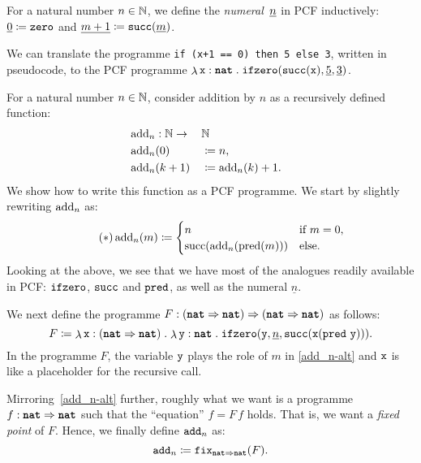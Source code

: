 \begin{definition}
  For a natural number \(n \in \Nat\), we define the
  \emph{numeral}~\(\numeral n\) in PCF inductively:
  \(\numeral 0 \coloneqq \pcfzero\) and
  \(\numeral{m+1} \coloneqq \pcfsuc(\numeral m)\).
\end{definition}

\begin{example}
  We can translate the programme \verb|if (x+1 == 0) then 5 else 3|, written in
  pseudocode, to the PCF programme
  \(\lambdadot{\var x : \pcfnat}{\pcfifz(\pcfsuc(\var x),\numeral 5,\numeral 3)}\).
\end{example}

\begin{example}
  For a natural number \(n \in \Nat\), consider addition by \(n\) as a
  recursively defined function:
  \begin{alignat*}{3}
    &\add_n : \Nat \to && \Nat && \\
    &\add_n(0) &&\coloneqq n, && \\
    &\add_n(k+1) &&\coloneqq \add_n(k) + 1. &&
  \end{alignat*}
  We show how to write this function as a PCF programme. We start by slightly
  rewriting \(\add_n\) as:
  \begin{equation*}\label{add_n-alt}\tag{\(\ast\)}
    \add_n(m) \coloneqq
    \begin{cases}
      n &\text{if } m = 0, \\
      \suc\pa*{\add_n(\pred(m))} &\text{else}.
    \end{cases}
  \end{equation*}
  Looking at the above, we see that we have most of the analogues readily
  available in PCF: \(\pcfifz\), \(\pcfsuc\) and \(\pcfpred\), as well as the
  numeral \(\underline n\).

  We next define the programme
  \(F : \pa*{\pcfnat \pcffun \pcfnat} \pcffun \pa*{\pcfnat \pcffun \pcfnat}\) as
  follows:
  \[
    F \coloneqq \lambdadot{\var x : \pa{\pcfnat \pcffun
        \pcfnat}}{\lambdadot{\var y : \pcfnat}%
      {\pcfifz\pa*{\var y,\numeral{n},%
          \pcfsuc\pa*{\var x\pa*{\pcfpred \, \var y }}}}}.
  \]
  In the programme \(F\), the variable \(\var y\) plays the role of \(m\) in
  \eqref{add_n-alt} and \(\var x\) is like a placeholder for the recursive call.

  Mirroring~\eqref{add_n-alt} further, roughly what we want is a programme
  \(f : \pcfnat \pcffun \pcfnat\) such that the ``equation''
  \(f = F\,f\) holds. That is, we want a \emph{fixed point} of \(F\).
  Hence, we finally define \(\pcfadd_n\) as:
  \[
    \pcfadd_n \coloneqq \fix_{\pcfnat \pcffun \pcfnat}(F).
  \]
\end{example}

